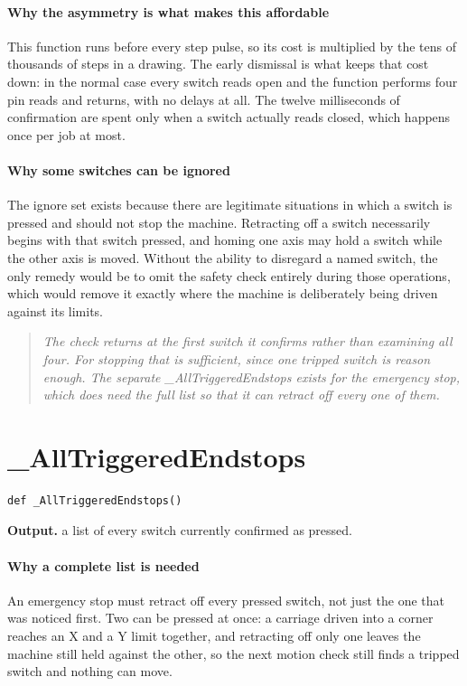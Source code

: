 \paragraph{Why the asymmetry is what makes this affordable}
This function runs before every step pulse, so its cost is multiplied by the tens of thousands of steps in a drawing. The early dismissal is what keeps that cost down: in the normal case every switch reads open and the function performs four pin reads and returns, with no delays at all. The twelve milliseconds of confirmation are spent only when a switch actually reads closed, which happens once per job at most.


\paragraph{Why some switches can be ignored}
The ignore set exists because there are legitimate situations in which a switch is pressed and should not stop the machine. Retracting off a switch necessarily begins with that switch pressed, and homing one axis may hold a switch while the other axis is moved. Without the ability to disregard a named switch, the only remedy would be to omit the safety check entirely during those operations, which would remove it exactly where the machine is deliberately being driven against its limits.


\begin{quote}\small\itshape The check returns at the first switch it confirms rather than examining all four. For stopping that is sufficient, since one tripped switch is reason enough. The separate \_AllTriggeredEndstops exists for the emergency stop, which does need the full list so that it can retract off every one of them.\end{quote}

\section{\_AllTriggeredEndstops}
\begin{lstlisting}[style=sig]
def _AllTriggeredEndstops()
\end{lstlisting}

\noindent\textbf{Output.} a list of every switch currently confirmed as pressed.


\paragraph{Why a complete list is needed}
An emergency stop must retract off every pressed switch, not just the one that was noticed first. Two can be pressed at once: a carriage driven into a corner reaches an X and a Y limit together, and retracting off only one leaves the machine still held against the other, so the next motion check still finds a tripped switch and nothing can move.


